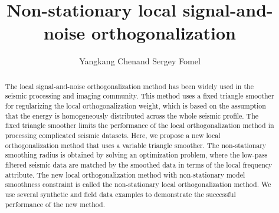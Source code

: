 

\DeclareRobustCommand{\dlo}[1]{}
\DeclareRobustCommand{\wen}[1]{#1}

\title{Non-stationary local signal-and-noise orthogonalization}
\author{Yangkang Chen\footnotemark[1] and Sergey Fomel\footnotemark[2]}

\renewcommand{\thefootnote}{\fnsymbol{footnote}}


\address{
\footnotemark[1]
School of Earth Sciences\\
Zhejiang University\\
Hangzhou, Zhejiang Province, China, 310027\\
chenyk2016@gmail.com \\
\footnotemark[2]Bureau of Economic Geology \\
John A. and Katherine G. Jackson School of Geosciences \\
The University of Texas at Austin \\
University Station, Box X \\
Austin, TX 78713-8924 \\
sergey.fomel@beg.utexas.edu
}




\begin{abstract}
The local signal-and-noise orthogonalization method has been widely used in the seismic processing and imaging community. This method uses a fixed triangle smoother for regularizing the local orthogonalization weight, which is based on the assumption that the energy is homogeneously distributed across the whole seismic profile. The fixed triangle smoother limits the performance of the local orthogonalization method in processing complicated seismic datasets. Here, we propose a new local orthogonalization method that uses a variable triangle smoother. The non-stationary smoothing radius is obtained by solving an optimization problem, where the low-pass filtered seismic data are matched by the smoothed data in terms of the local frequency attribute. The new local orthogonalization method with non-stationary model smoothness constraint is called the non-stationary local orthogonalization method. We use several synthetic and field data examples to demonstrate the successful performance of the new method.
\end{abstract}

